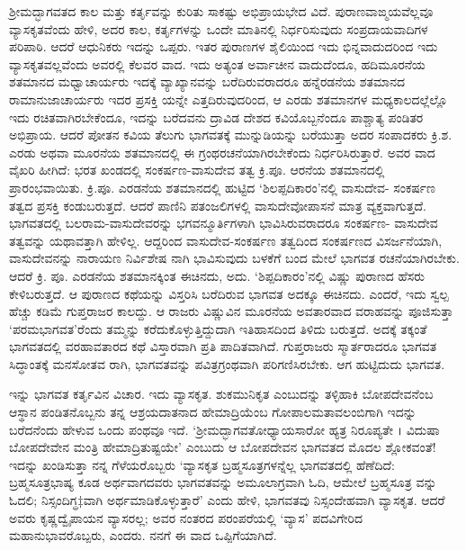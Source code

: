 ಶ್ರೀಮದ್ಭಾಗವತದ ಕಾಲ ಮತ್ತು ಕರ್ತೃವನ್ನು ಕುರಿತು ಸಾಕಷ್ಟು ಅಭಿಪ್ರಾಯಭೇದ ವಿದೆ. ಪುರಾಣವಾಙ್ಮಯವೆಲ್ಲವೂ ವ್ಯಾಸಕೃತವೆಂದು ಹೇಳಿ, ಅದರ ಕಾಲ, ಕರ್ತೃಗಳನ್ನು ಒಂದೇ ಮಾತಿನಲ್ಲಿ ನಿರ್ಧರಿಸುವುದು ಸಂಪ್ರದಾಯವಾದಿಗಳ ಪರಿಪಾಠಿ. ಆದರೆ ಆಧುನಿಕರು ಇದನ್ನು ಒಪ್ಪರು. ಇತರ ಪುರಾಣಗಳ ಶೈಲಿಯಿಂದ ಇದು ಭಿನ್ನವಾದುದರಿಂದ ಇದು ವ್ಯಾಸಕೃತವಲ್ಲವೆಂದು ಅವರಲ್ಲಿ ಕೆಲವರ ವಾದ. ಇದು ಅತ್ಯಂತ ಅರ್ವಾಚೀನ ವಾದುದೆಂದೂ, ಹದಿಮೂರನೆಯ ಶತಮಾನದ ಮಧ್ವಾಚಾರ್ಯರು ಇದಕ್ಕೆ ವ್ಯಾಖ್ಯಾನವನ್ನು ಬರೆದಿರುವರಾದರೂ ಹನ್ನೆರಡನೆಯ ಶತಮಾನದ ರಾಮಾನುಜಾಚಾರ್ಯರು ಇದರ ಪ್ರಸಕ್ತಿ ಯನ್ನೇ ಎತ್ತದಿರುವುದರಿಂದ, ಆ ಎರಡು ಶತಮಾನಗಳ ಮಧ್ಯಕಾಲದಲ್ಲೆಲ್ಲೊ ಇದು ರಚಿತವಾಗಿರಬೇಕೆಂದೂ, ಇದನ್ನು ಬರೆದವನು ದ್ರಾವಿಡ ದೇಶದ ಕವಿಯೊಬ್ಬನೆಂದೂ ಪಾಶ್ಚಾತ್ಯ ಪಂಡಿತರ ಅಭಿಪ್ರಾಯ. ಆದರೆ ಪೋತನ ಕವಿಯ ತೆಲುಗು ಭಾಗವತಕ್ಕೆ ಮುನ್ನುಡಿಯನ್ನು ಬರೆಯುತ್ತಾ ಅದರ ಸಂಪಾದಕರು ಕ್ರಿ.ಶ. ಎರಡು ಅಥವಾ ಮೂರನೆಯ ಶತಮಾನದಲ್ಲಿ ಈ ಗ್ರಂಥರಚನೆಯಾಗಿರಬೇಕೆಂದು ನಿರ್ಧರಿಸಿರುತ್ತಾರೆ. ಅವರ ವಾದ ವೈಖರಿ ಹೀಗಿದೆ: ಭರತ ಖಂಡದಲ್ಲಿ ಸಂಕರ್ಷಣ-ವಾಸುದೇವ ತತ್ವ ಕ್ರಿ.ಪೂ. ಆರನೆಯ ಶತಮಾನದಲ್ಲಿ ಪ್ರಾರಂಭವಾಯಿತು. ಕ್ರಿ.ಪೂ. ಎರಡನೆಯ ಶತಮಾನದಲ್ಲಿ ಹುಟ್ಟಿದ ‘ಶಿಲಪ್ಪದಿಕಾರಂ’ನಲ್ಲಿ ವಾಸುದೇವ- ಸಂಕರ್ಷಣ ತತ್ವದ ಪ್ರಸಕ್ತಿ ಕಂಡುಬರುತ್ತದೆ. ಆದರೆ ಪಾಣಿನಿ ಪತಂಜಲಿಗಳಲ್ಲಿ ವಾಸುದೇವೋಪಾಸನೆ ಮಾತ್ರ ವ್ಯಕ್ತವಾಗುತ್ತದೆ. ಭಾಗವತದಲ್ಲಿ ಬಲರಾಮ-ವಾಸುದೇವರನ್ನು ಭಗವನ್ಮೂರ್ತಿಗಳಾಗಿ ಭಾವಿಸಿರುವರಾದರೂ ಸಂಕರ್ಷಣ- ವಾಸುದೇವ ತತ್ವವನ್ನು ಯಥಾವತ್ತಾಗಿ ಹೇಳಿಲ್ಲ. ಆದ್ದರಿಂದ ವಾಸುದೇವ-ಸಂಕರ್ಷಣ ತತ್ವದಿಂದ ಸಂಕರ್ಷಣದ ವಿಸರ್ಜನೆಯಾಗಿ, ವಾಸುದೇವನನ್ನು ನಾರಾಯಣ ನಿರ್ವಿಶೇಷ ನಾಗಿ ಭಾವಿಸುವುದು ಬಳಕೆಗೆ ಬಂದ ಮೇಲೆ ಭಾಗವತ ರಚನೆಯಾಗಿರಬೇಕು. ಆದರೆ ಕ್ರಿ. ಪೂ. ಎರಡನೆಯ ಶತಮಾನಕ್ಕಿಂತ ಈಚಿನದು, ಅದು. ‘ಶಿಪ್ಪದಿಕಾರಂ’ನಲ್ಲಿ ವಿಷ್ಣು ಪುರಾಣದ ಹೆಸರು ಕೇಳಿಬರುತ್ತದೆ. ಆ ಪುರಾಣದ ಕಥೆಯನ್ನು ವಿಸ್ತರಿಸಿ ಬರೆದಿರುವ ಭಾಗವತ ಅದಕ್ಕೂ ಈಚಿನದು. ಎಂದರೆ, ಇದು ಸ್ವಲ್ಪ ಹೆಚ್ಚು ಕಡಿಮೆ ಗುಪ್ತರಾಜರ ಕಾಲದ್ದು. ಆ ರಾಜರು ವಿಷ್ಣುವಿನ ಮೂರನೆಯ ಅವತಾರವಾದ ವರಾಹವನ್ನು ಪೂಜಿಸುತ್ತಾ ‘ಪರಮಭಾಗವತ’ರೆಂದು ತಮ್ಮನ್ನು ಕರೆದುಕೊಳ್ಳುತ್ತಿದ್ದುದಾಗಿ ಇತಿಹಾಸದಿಂದ ತಿಳಿದು ಬರುತ್ತದೆ. ಅದಕ್ಕೆ ತಕ್ಕಂತೆ ಭಾಗವತದಲ್ಲಿ ವರಹಾವತಾರದ ಕಥೆ ವಿಸ್ತಾರವಾಗಿ ಪ್ರತಿ ಪಾದಿತವಾಗಿದೆ. ಗುಪ್ತರಾಜರು ಸ್ಮಾರ್ತರಾದರೂ ಭಾಗವತ ಸಿದ್ಧಾಂತಕ್ಕೆ ಮನಸೋತವ ರಾಗಿ, ಭಾಗವತವನ್ನು ಪವಿತ್ರಗ್ರಂಥವಾಗಿ ಪರಿಗಣಿಸಿರಬೇಕು. ಆಗ ಹುಟ್ಟಿದುದು ಭಾಗವತ.

ಇನ್ನು ಭಾಗವತ ಕರ್ತೃವಿನ ವಿಚಾರ. ಇದು ವ್ಯಾಸಕೃತ. ಶುಕಮುನಿಕೃತ ಎಂಬುದನ್ನು ತಳ್ಳಿಹಾಕಿ ಬೋಪದೇವನೆಂಬ ಆಸ್ಥಾನ ಪಂಡಿತನೊಬ್ಬನು ತನ್ನ ಆಶ್ರಯದಾತನಾದ ಹೇಮಾದ್ರಿಯೆಂಬ ಗೋಪಾಲಮತಾವಲಂಬಿಗಾಗಿ ಇದನ್ನು ಬರೆದನೆಂದು ಹೇಳುವ ಒಂದು ಪಂಥವೂ ಇದೆ. ‘ಶ್ರೀಮದ್ಭಾಗವತೋಧ್ಯಾಯಸಾರೋ ಹ್ಯತ್ರ ನಿರೂಪ್ಯತೇ । ವಿದುಷಾ ಬೋಪದೇವೇನ ಮಂತ್ರಿ ಹೇಮಾದ್ರಿತುಷ್ಟಯೇ’ ಎಂಬುದು ಆ ಬೋಪದೇವನ ಭಾಗವತದ ಮೊದಲ ಶ್ಲೋಕವಂತೆ! ಇದನ್ನು ಖಂಡಿಸುತ್ತಾ ನನ್ನ ಗೆಳೆಯರೊಬ್ಬರು ‘ವ್ಯಾಸಕೃತ ಬ್ರಹ್ಮಸೂತ್ರಗಳನ್ನೆಲ್ಲ ಭಾಗವತದಲ್ಲಿ ಹೆಣೆದಿದೆ: ಬ್ರಹ್ಮಸೂತ್ರಭಾಷ್ಯ ಕೂಡ ಅರ್ಥವಾಗದವರು ಭಾಗವತವನ್ನು ಅಮೂಲಾಗ್ರವಾಗಿ ಓದಿ, ಆಮೇಲೆ ಬ್ರಹ್ಮಸೂತ್ರ ವನ್ನು ಓದಲಿ; ನಿಸ್ಸಂದಿಗ್ಧ‡ವಾಗಿ ಅರ್ಥಮಾಡಿಕೊಳ್ಳುತ್ತಾರೆ’ ಎಂದು ಹೇಳಿ, ಭಾಗವತವು ನಿಸ್ಸಂದೇಹವಾಗಿ ವ್ಯಾಸಕೃತ. ಆದರೆ ಅವರು ಕೃಷ್ಣದ್ವೈಪಾಯನ ವ್ಯಾಸರಲ್ಲ; ಅವರ ನಂತರದ ಪರಂಪರೆಯಲ್ಲಿ ‘ವ್ಯಾಸ’ ಪದವಿಗೇರಿದ ಮಹಾನುಭಾವರೊಬ್ಪರು, ಎಂದರು. ನನಗೆ ಈ ವಾದ ಒಪ್ಪಿಗೆಯಾಗಿದೆ.

